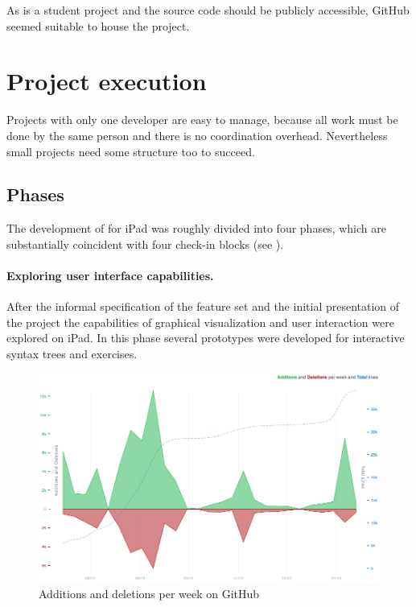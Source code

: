 As \Nyaya is a student project and the source code should be publicly accessible,
GitHub seemed suitable to house the project.

\section{Project execution}

Projects with only one developer are easy to manage, 
because all work must be done by the same person
and there is no coordination overhead.
Nevertheless small projects need some structure too to succeed.

\subsection{Phases}

The development of \Nyaya for iPad was roughly divided into four phases,
which are substantially coincident with four check-in blocks (see ).

\paragraph{Exploring user interface capabilities.}

After the informal specification of the feature set and the initial presentation of the project
the capabilities of graphical visualization and  user interaction were explored on iPad.
In this phase several prototypes were developed for interactive syntax trees and exercises.

\begin{figure}[htbp]
\begin{center}
\includegraphics[scale=0.41]{pics/work.png}
\caption{Additions and deletions per week on GitHub}
\label{fig:GitHubGraphAddDel}
\end{center}
\end{figure}

